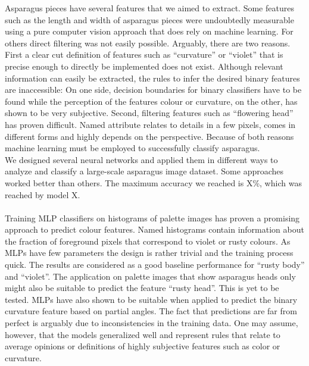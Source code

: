 Asparagus pieces have several features that we aimed to extract. Some features such as the length and width of asparagus pieces were undoubtedly measurable using a pure computer vision approach that does rely on machine learning. For others direct filtering was not easily possible. Arguably, there are two reasons. First a clear cut definition of features such as “curvature” or “violet” that is precise enough to directly be implemented does not exist. Although relevant information can easily be extracted, the rules to infer the desired binary features are inaccessible: On one side, decision boundaries for binary classifiers have to be found while the perception of the features colour or curvature, on the other, has shown to be very subjective. Second, filtering features such as “flowering head” has proven difficult. Named attribute relates to details in a few pixels, comes in different forms and highly depends on the perspective. Because of both reasons machine learning must be employed to successfully classify asparagus. \\
We designed several neural networks and applied them in different ways to analyze and classify a large-scale asparagus image dataset. Some approaches worked better than others. The maximum accuracy we reached is X\%, which was reached by model X.  \\
\\
Training MLP classifiers on histograms of palette images has proven a promising approach to predict colour features. Named histograms contain information about the fraction of foreground pixels that correspond to violet or rusty colours. As MLPs have few parameters the design is rather trivial and the training process quick. The results are considered as a good baseline performance for “rusty body” and “violet”. The application on palette images that show asparagus heads only might also be suitable to predict the feature “rusty head”. This is yet to be tested. MLPs have also shown to be suitable when applied to predict the binary curvature feature based on partial angles. The fact that predictions are far from perfect is arguably due to inconsistencies in the training data. One may assume, however, that the models generalized well and represent rules that relate to average opinions or definitions of highly subjective features such as color or curvature. \\
\\
